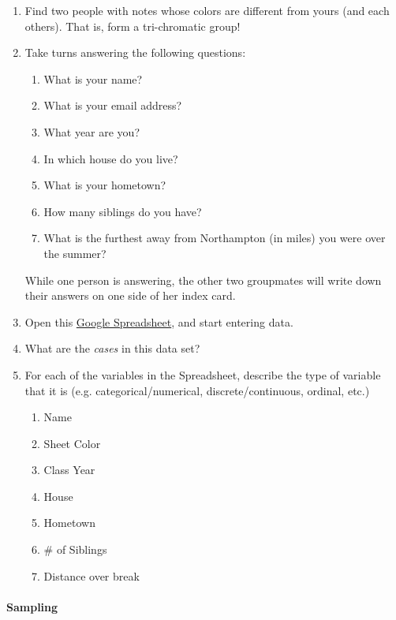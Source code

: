 \documentclass[10pt]{article}
\newcommand{\ans}{\vspace{0.25in}}
\begin{document}
\begin{enumerate}

  \item Find two people with notes whose colors are different from yours (and each others). That is, form a tri-chromatic group!
  \item Take turns answering the following questions:
  \begin{enumerate}
    \itemsep0em
    \item What is your name?
    \item What is your email address?
    \item What year are you?
    \item In which house do you live?
    \item What is your hometown?
    \item How many siblings do you have?
    \item What is the furthest away from Northampton (in miles) you were over the summer?
  \end{enumerate}
  While one person is answering, the other two groupmates will write down their answers on one side of her index card.

  \item Open this \href{https://docs.google.com/a/smith.edu/spreadsheets/d/118aPBX8HErJX7HUEstN9pfhAS-TLUqv0M9eitKq8_7U/edit?usp=sharing}{Google Spreadsheet}, and start entering data. 

  \item What are the \emph{cases} in this data set?
  \ans
  
  \item For each of the variables in the Spreadsheet, describe the type of variable that it is (e.g. categorical/numerical, discrete/continuous, ordinal, etc.)
  \begin{enumerate}
    \itemsep0.4in
    \item Name
    \item Sheet Color
    \item Class Year
    \item House
    \item Hometown
    \item \# of Siblings
    \item Distance over break
  \end{enumerate}

\end{enumerate}

\paragraph{Sampling}
\end{document}
